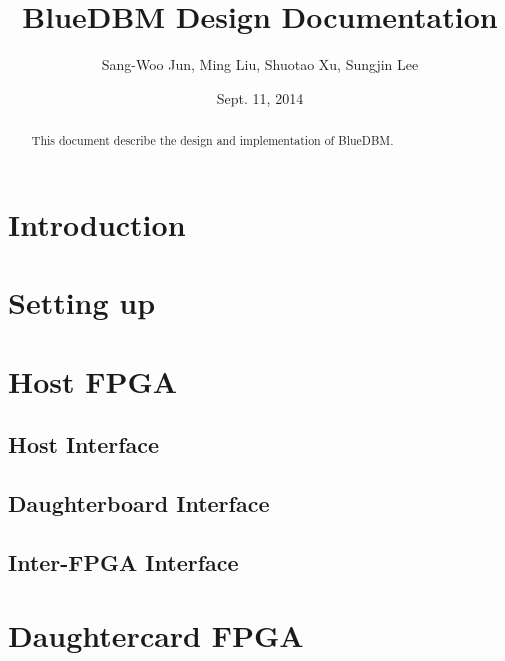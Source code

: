 \documentclass[12pt]{article}
\title{BlueDBM Design Documentation}
\author{Sang-Woo Jun, Ming Liu, Shuotao Xu, Sungjin Lee}%
\date{Sept. 11, 2014}%
\begin{document}
\maketitle

\begin{abstract}
This document describe the design and implementation of BlueDBM.
\end{abstract}

\section{Introduction}

\section{Setting up}

\section{Host FPGA}
\subsection{Host Interface}

\subsection{Daughterboard Interface}

\subsection{Inter-FPGA Interface}

\section{Daughtercard FPGA}
\end{document}
